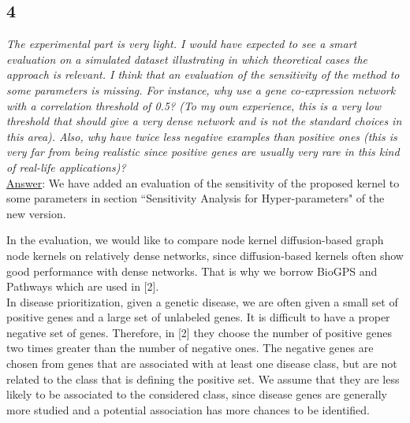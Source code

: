 \documentclass[11pt]{article}
\begin{document}
\subsection*{4} \textit{The experimental part is very light. I would have expected to see a smart evaluation on a simulated dataset illustrating in which theoretical cases the approach is relevant. I think that an evaluation of the sensitivity of the method to some parameters is missing. For instance, why use a gene co-expression network with a correlation threshold of 0.5? (To my own experience, this is a very low threshold that should give a very dense network and is not the standard choices in this area). Also, why have twice less negative examples than positive ones (this is very far from being realistic since positive genes are usually very rare in this kind of real-life applications)?} \\

\underline{Answer}: We have added an evaluation of the sensitivity of the proposed kernel to some parameters in section ``Sensitivity Analysis for Hyper-parameters" of the new version.

In the evaluation, we would like to compare node kernel diffusion-based graph node kernels on relatively dense networks, since diffusion-based kernels often show good performance with dense networks. That is why we borrow BioGPS and Pathways which are used in [2]. \\

In disease prioritization, given a genetic disease, we are often given a small set of positive genes and a large set of unlabeled genes. It is difficult to have a proper negative set of genes. Therefore, in [2] they choose the number of positive genes two times greater than the number of negative ones. The negative genes are chosen from genes that are associated with at least one disease class, but are not related to the class that is defining the positive set. We assume that they are less likely to be associated to the considered class, since disease genes are generally more studied and a potential association has more chances to be identified.
\end{document}
